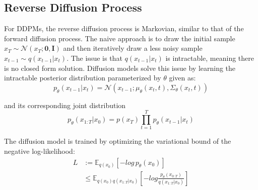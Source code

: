 \subsection{Reverse Diffusion Process} \label{sec:reverse_diffusion_process}

For DDPMs, the reverse diffusion process is Markovian, similar to that of the forward diffusion process. 
The naive approach is to draw the initial sample $x_T \sim \mathcal{N}\left(x_T;\boldsymbol{0},\boldsymbol{I}\right)$ and then iteratively draw a less noisy sample $x_{t-1} \sim q\left(x_{t-1}|x_{t}\right)$. The issue is that $q\left(x_{t-1}|x_{t}\right)$ is intractable, meaning there is no closed form solution. Diffusion models solve this issue by learning the intractable posterior distribution parameterized by $\theta$ given as:
\begin{equation}
\label{eq:intractable_posterior_distribution}
p_{\theta}\left(x_{t-1}|x_t\right) = \mathcal{N}\left(x_{t-1};\mu_{\theta}\left(x_t,t\right),\Sigma_{\theta}\left(x_t,t\right)\right)
\end{equation}

and its corresponding joint distribution
\begin{equation}
\label{eq:joint_reverse_distribution}
p_{\theta}\left(x_{1:T}|x_{0}\right) = p\left(x_{T}\right)\prod_{t=1}^{T} p_{\theta}\left(x_{t-1}|x_{t}\right)
\end{equation}

The diffusion model is trained by optimizing the variational bound of the negative log-likelihood: 
\begin{equation}
\begin{aligned}
L & := \mathbb{E}_{q\left(x_{0}\right)}\left[-log\, p_{\theta}\left(x_{0}\right)\right] \\
  & \le \mathbb{E}_{q\left(x_{0}\right)q\left(x_{1:T}|x_0\right)}\left[-log\frac{p_{\theta}\left(x_{0:T}\right)}{q\left(x_{1:T}|x_0\right)}\right]
\end{aligned}
\end{equation}

